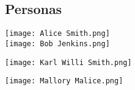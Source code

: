 \newpage
\subsection{Personas}

\texttt{[image: Alice Smith.png]}
\\
\texttt{[image: Bob Jenkins.png]}

\texttt{[image: Karl Willi Smith.png]}

\texttt{[image: Mallory Malice.png]}

